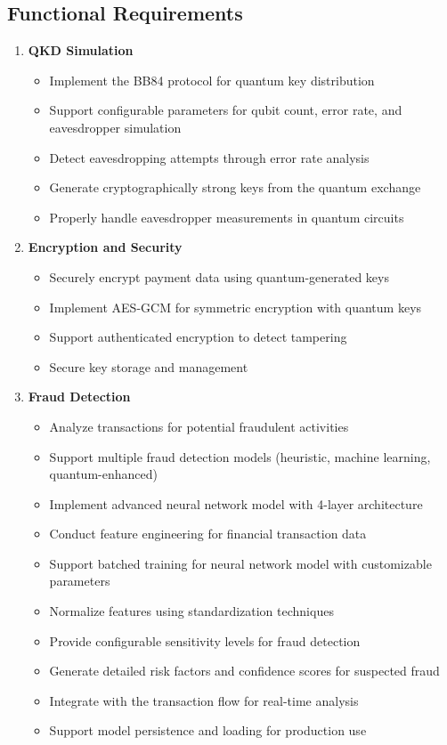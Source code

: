\documentclass[onecolumn,a4paper,10pt]{IEEEtran}
\begin{document}
\subsection{Functional Requirements}
\begin{enumerate}
    \item \textbf{QKD Simulation}
    \begin{itemize}
        \item Implement the BB84 protocol for quantum key distribution
        \item Support configurable parameters for qubit count, error rate, and eavesdropper simulation
        \item Detect eavesdropping attempts through error rate analysis
        \item Generate cryptographically strong keys from the quantum exchange
        \item Properly handle eavesdropper measurements in quantum circuits
    \end{itemize}
    
    \item \textbf{Encryption and Security}
    \begin{itemize}
        \item Securely encrypt payment data using quantum-generated keys
        \item Implement AES-GCM for symmetric encryption with quantum keys
        \item Support authenticated encryption to detect tampering
        \item Secure key storage and management
    \end{itemize}
    
    \item \textbf{Fraud Detection}
    \begin{itemize}
        \item Analyze transactions for potential fraudulent activities
        \item Support multiple fraud detection models (heuristic, machine learning, quantum-enhanced)
        \item Implement advanced neural network model with 4-layer architecture
        \item Conduct feature engineering for financial transaction data
        \item Support batched training for neural network model with customizable parameters
        \item Normalize features using standardization techniques
        \item Provide configurable sensitivity levels for fraud detection
        \item Generate detailed risk factors and confidence scores for suspected fraud
        \item Integrate with the transaction flow for real-time analysis
        \item Support model persistence and loading for production use
    \end{itemize}
    

\end{enumerate}
\end{document}
